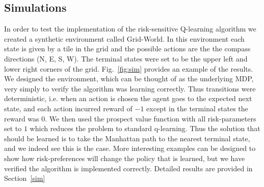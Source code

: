 \documentclass{article}
\begin{document}
\subsection{Simulations}
In order to test the implementation of the risk-sensitive Q-learning algorithm we created a synthetic environment called Grid-World. In this environment each state is given by a tile in the grid and the possible actions are the the compass directions (N, E, S, W). The terminal states were set to be the upper left and lower right corners of the grid. Fig.~\ref{fig:sim} provides an example of the results. We designed the environment, which can be thought of as the underlying MDP, very simply to verify the algorithm was learning correctly. Thus transitions were deterministic, i.e. when an action is chosen the agent goes to the expected next state, and each action incurred reward of $-1$ except in the terminal states the reward was $0$. We then used the prospect value function with all risk-parameters set to $1$ which reduces the problem to standard q-learning. Thus the solution that should be learned is to take the Manhattan path to the nearest terminal state, and we indeed see this is the case. More interesting examples can be designed to show how risk-preferences will change the policy that is learned, but we have verified the algorithm is implemented correctly. Detailed results are provided in Section~\ref{sim}
\end{document}
